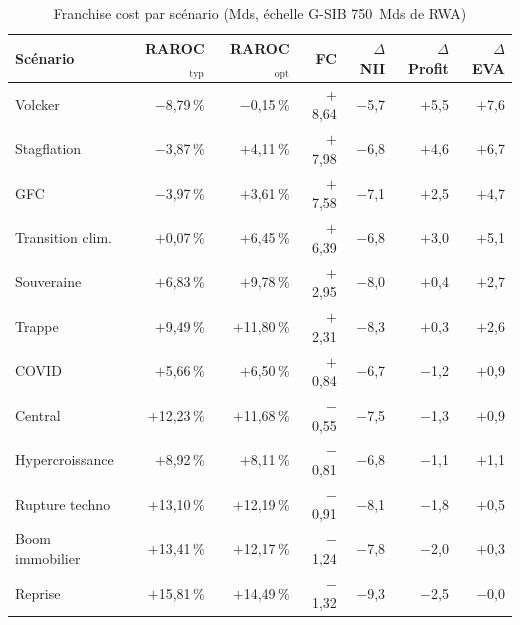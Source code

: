 \documentclass[10pt, a4paper, oneside]{report}
\theoremstyle{definition}
\begin{document}
\begin{table}[htbp]
\centering
\caption{Franchise cost par scénario (Mds\texteuro, échelle G-SIB 750~Mds de RWA)}
\label{tab:fc-scenarios}
\small
\begin{tabular}{lrrrrrr}
\toprule
Scénario & RAROC$_{\text{typ}}$ & RAROC$_{\text{opt}}$ & FC & $\Delta$NII & $\Delta$Profit & $\Delta$EVA \\
\midrule
Volcker        & $-$8{,}79\,\% & $-$0{,}15\,\% & $+$8{,}64 & $-$5{,}7 & $+$5{,}5 & $+$7{,}6 \\
Stagflation    & $-$3{,}87\,\% & $+$4{,}11\,\% & $+$7{,}98 & $-$6{,}8 & $+$4{,}6 & $+$6{,}7 \\
GFC            & $-$3{,}97\,\% & $+$3{,}61\,\% & $+$7{,}58 & $-$7{,}1 & $+$2{,}5 & $+$4{,}7 \\
Transition clim.& $+$0{,}07\,\% & $+$6{,}45\,\% & $+$6{,}39 & $-$6{,}8 & $+$3{,}0 & $+$5{,}1 \\
Souveraine     & $+$6{,}83\,\% & $+$9{,}78\,\% & $+$2{,}95 & $-$8{,}0 & $+$0{,}4 & $+$2{,}7 \\
Trappe         & $+$9{,}49\,\% & $+$11{,}80\,\%& $+$2{,}31 & $-$8{,}3 & $+$0{,}3 & $+$2{,}6 \\
COVID          & $+$5{,}66\,\% & $+$6{,}50\,\% & $+$0{,}84 & $-$6{,}7 & $-$1{,}2 & $+$0{,}9 \\
Central        & $+$12{,}23\,\%& $+$11{,}68\,\%& $-$0{,}55 & $-$7{,}5 & $-$1{,}3 & $+$0{,}9 \\
Hypercroissance& $+$8{,}92\,\% & $+$8{,}11\,\% & $-$0{,}81 & $-$6{,}8 & $-$1{,}1 & $+$1{,}1 \\
Rupture techno & $+$13{,}10\,\%& $+$12{,}19\,\%& $-$0{,}91 & $-$8{,}1 & $-$1{,}8 & $+$0{,}5 \\
Boom immobilier& $+$13{,}41\,\%& $+$12{,}17\,\%& $-$1{,}24 & $-$7{,}8 & $-$2{,}0 & $+$0{,}3 \\
Reprise        & $+$15{,}81\,\%& $+$14{,}49\,\%& $-$1{,}32 & $-$9{,}3 & $-$2{,}5 & $-$0{,}0 \\
\bottomrule
\end{tabular}
\end{table}
\end{document}
